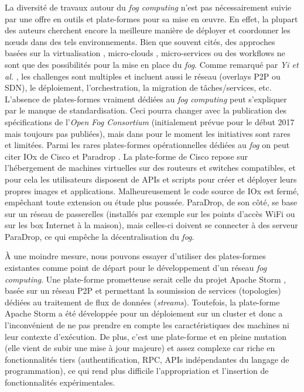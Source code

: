 La diversité de travaux autour du \textit{fog computing} n'est pas nécessairement suivie par une offre en outils et plate-formes pour sa mise en {\oe}uvre. En effet, la plupart des auteurs cherchent encore la meilleure manière de déployer et coordonner les n{\oe}uds dans des tels environnements. Bien que souvent cités, des approches basées sur la virtualisation \cite{Satyanarayanan09}, micro-clouds \cite{Elkhatib2017},  micro-services \cite{Villari2016} ou des workflows \cite{Hao2017} ne sont que des possibilités pour la mise en place du \textit{fog}. Comme remarqué par \textit{Yi et al.} \cite{Yi2015}, les challenges sont multiples et incluent aussi le réseau (overlays P2P ou SDN), le déploiement, l'orchestration, la migration de tâches/services, etc. L'absence de plates-formes vraiment dédiées au \textit{fog computing} peut s'expliquer par le manque de standardisation. Ceci pourra changer avec la publication des spécifications de l'\textit{Open Fog Consortium} (initialement prévue pour le début 2017 mais toujours pas publiées), mais dans pour le moment les initiatives sont rares et limitées. Parmi les rares plates-formes opérationnelles dédiées au \textit{fog} on peut citer IOx de Cisco \cite{IOx2017} et Paradrop \cite{Willis2014}. La plate-forme de Cisco repose sur l'hébergement de machines virtuelles sur des routeurs et switches compatibles, et pour cela les utilisateurs disposent de APIs et scripts pour créer et déployer leurs propres images et applications. Malheureusement le code source de IOx est fermé, empêchant toute extension ou étude plus poussée. ParaDrop, de son côté, se base sur un réseau de passerelles (installés par exemple sur les points d'accès WiFi ou sur les box Internet à la maison), mais celles-ci doivent se connecter à des serveur ParaDrop, ce qui empêche la décentralisation du \textit{fog}. 
 
À une moindre mesure, nous pouvons essayer d'utiliser des plates-formes existantes comme point de départ pour le développement d'un réseau \textit{fog computing}. Une plate-forme prometteuse serait celle du projet Apache Storm \cite{ApacheStorm} , basée sur un réseau P2P et permettant la soumission de services (topologies) dédiées au traitement de flux de données (\textit{streams}). Toutefois, la plate-forme Apache Storm a été développée pour un déploiement sur un cluster et donc a l'inconvénient de ne pas prendre en compte les caractéristiques des machines ni leur contexte d'exécution. De plus, c'est une plate-forme et en pleine mutation (elle vient de subir une mise à jour majeure) et assez complexe car riche en fonctionnalités tiers (authentification, RPC, APIs indépendantes du langage de programmation), ce qui rend plus difficile l'appropriation et l'insertion de fonctionnalités expérimentales. 


